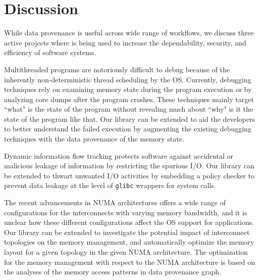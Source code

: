 \section{Discussion}
\label{sec:discussion}
While data provenance is useful across wide range of workflows, we discuss three active projects where \projecttitle is being used to increase the dependability, security, and efficiency of software systems. 

 Multithreaded programs are notoriously difficult to debug because of the inherently non-deterministic thread scheduling by the OS.  Currently, debugging techniques rely on examining memory state during the program execution or by analyzing core dumps after the program crashes. These techniques mainly target ``what" is the state of the program without revealing much about ``why" is it the state of the program like that. Our library can be extended to aid the developers to better understand the failed execution by augmenting the existing debugging techniques with the data provenance of the memory state.


%
%
%


 Dynamic information flow tracking protects software against accidental or malicious leakage of information by restricting the spurious I/O. Our library can be extended to thwart unwanted I/O activities by embedding a policy checker to prevent data leakage at the level of {\tt glibc} wrappers for system calls.



 The recent advancements in NUMA architectures offers a wide range of configurations for the interconnects with varying memory bandwidth, and  it is unclear how these different configurations affect the OS support for applications. Our library can be extended to investigate the potential impact of interconnect topologies on the memory management, and automatically optimize the memory layout  for a given  topology in the given NUMA architecture.  The optimization for  the  memory management with respect to the NUMA architecture is based on the  analyses of the memory access patterns in data provenance graph.

